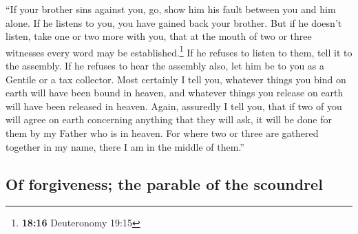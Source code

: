  ``If your brother sins against you, go, show him his
fault between you and him alone. If he listens to you, you have gained
back your brother.  But if he doesn't listen, take one or
two more with you, that at the mouth of two or three witnesses every
word may be established.\footnote{\textbf{18:16} Deuteronomy 19:15}
 If he refuses to listen to them, tell it to the
assembly. If he refuses to hear the assembly also, let him be to you as
a Gentile or a tax collector.  Most certainly I tell you,
whatever things you bind on earth will have been bound in heaven, and
whatever things you release on earth will have been released in heaven.
 Again, assuredly I tell you, that if two of you will
agree on earth concerning anything that they will ask, it will be done
for them by my Father who is in heaven.  For where two or
three are gathered together in my name, there I am in the middle of
them.''

\hypertarget{of-forgiveness-the-parable-of-the-scoundrel}{%
\subsection{Of forgiveness; the parable of the
scoundrel}\label{of-forgiveness-the-parable-of-the-scoundrel}}

